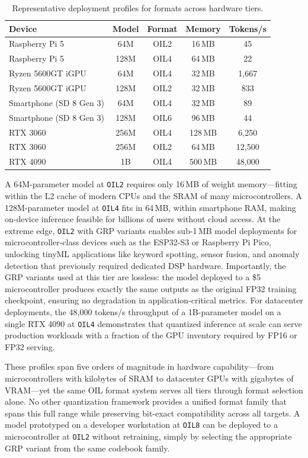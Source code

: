 \begin{table}[htbp]
\centering
{}
\caption{Representative deployment profiles for \OIL{} formats across hardware tiers.}
\label{tab:conclusion_deployment}
\begin{tabular}{lcccc}
\toprule
\textbf{Device} & \textbf{Model} & \textbf{Format} & \textbf{Memory} & \textbf{Tokens/s} \\
\midrule
Raspberry Pi 5 & 64M & OIL2 & 16\,MB & 45 \\
Raspberry Pi 5 & 128M & OIL4 & 64\,MB & 22 \\
Ryzen 5600GT iGPU & 64M & OIL4 & 32\,MB & 1,667 \\
Ryzen 5600GT iGPU & 128M & OIL2 & 32\,MB & 833 \\
Smartphone (SD 8 Gen 3) & 64M & OIL4 & 32\,MB & 89 \\
Smartphone (SD 8 Gen 3) & 128M & OIL6 & 96\,MB & 44 \\
RTX 3060 & 256M & OIL4 & 128\,MB & 6,250 \\
RTX 3060 & 256M & OIL2 & 64\,MB & 12,500 \\
RTX 4090 & 1B & OIL4 & 500\,MB & 48,000 \\
\bottomrule
\end{tabular}
\end{table}

A 64M-parameter model at \texttt{OIL2} requires only 16\,MB of weight memory---fitting within the L2 cache of modern CPUs and the SRAM of many microcontrollers. A 128M-parameter model at \texttt{OIL4} fits in 64\,MB, within smartphone RAM, making on-device inference feasible for billions of users without cloud access. At the extreme edge, \texttt{OIL2} with GRP variants enables sub-1\,MB model deployments for microcontroller-class devices such as the ESP32-S3 or Raspberry Pi Pico, unlocking tinyML applications like keyword spotting, sensor fusion, and anomaly detection that previously required dedicated DSP hardware. Importantly, the GRP variants used at this tier are lossless: the model deployed to a \$5 microcontroller produces exactly the same outputs as the original FP32 training checkpoint, ensuring no degradation in application-critical metrics. For datacenter deployments, the 48,000 tokens/s throughput of a 1B-parameter model on a single RTX 4090 at \texttt{OIL4} demonstrates that quantized inference at scale can serve production workloads with a fraction of the GPU inventory required by FP16 or FP32 serving.

These profiles span five orders of magnitude in hardware capability---from microcontrollers with kilobytes of SRAM to datacenter GPUs with gigabytes of VRAM---yet the same OIL format system serves all tiers through format selection alone. No other quantization framework provides a unified format family that spans this full range while preserving bit-exact compatibility across all targets. A model prototyped on a developer workstation at \texttt{OIL8} can be deployed to a microcontroller at \texttt{OIL2} without retraining, simply by selecting the appropriate GRP variant from the same codebook family.

